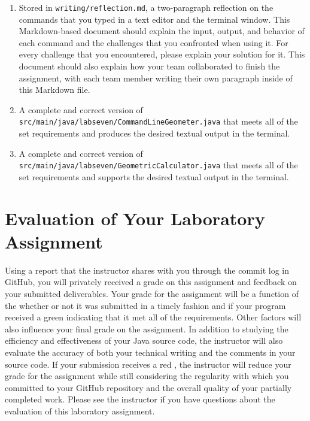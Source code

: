 \documentclass[11pt]{article}
\newcommand{\mainprogramsource}{\lstinline{src/main/java/labseven/CommandLineGeometer.java}}
\newcommand{\secondprogramsource}{\lstinline{src/main/java/labseven/GeometricCalculator.java}}
\newcommand{\reflection}{\lstinline{writing/reflection.md}}
\newcommand{\checkmark}{\ding{51}}
\newcommand{\naughtmark}{\ding{55}}
\begin{document}
\begin{enumerate}

  \setlength{\itemsep}{0in}

\item Stored in \reflection{}, a two-paragraph reflection on the commands that
  you typed in a text editor and the terminal window. This Markdown-based
  document should explain the input, output, and behavior of each command and
  the challenges that you confronted when using it. For every challenge that you
  encountered, please explain your solution for it. This document should also
  explain how your team collaborated to finish the assignment, with each team
  member writing their own paragraph inside of this Markdown file.

\item A complete and correct version of \mainprogramsource{} that meets all of
  the set requirements and produces the desired textual output in the terminal.

\item A complete and correct version of \secondprogramsource{} that meets all of
  the set requirements and supports the desired textual output in the terminal.

\end{enumerate}

\section*{Evaluation of Your Laboratory Assignment}

Using a report that the instructor shares with you through the commit log in
GitHub, you will privately received a grade on this assignment and feedback on
your submitted deliverables. Your grade for the assignment will be a function of
the whether or not it was submitted in a timely fashion and if your program
received a green \checkmark{} indicating that it met all of the requirements.
Other factors will also influence your final grade on the assignment. In
addition to studying the efficiency and effectiveness of your Java source code,
the instructor will also evaluate the accuracy of both your technical writing
and the comments in your source code. If your submission receives a red
\naughtmark{}, the instructor will reduce your grade for the assignment while
still considering the regularity with which you committed to your GitHub
repository and the overall quality of your partially completed work. Please see
the instructor if you have questions about the evaluation of this laboratory
assignment.
\end{document}

